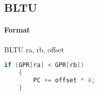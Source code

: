 \subsection{BLTU}


\paragraph{Format} BLTU ra, rb, offset

\begin{lstlisting}[language=c]
    if (GPR[ra] < GPR[rb])
    {
        PC += offset * 4;
    }
\end{lstlisting}
